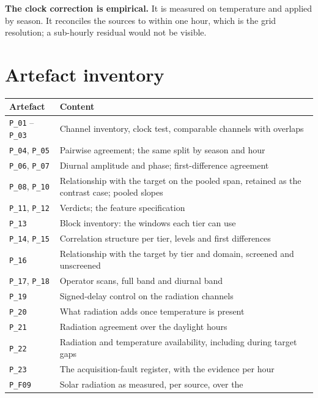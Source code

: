 \documentclass[11pt,a4paper]{article}
\begin{document}
\textbf{The clock correction is empirical.} It is measured on temperature and
applied by season. It reconciles the sources to within one hour, which is the
grid resolution; a sub-hourly residual would not be visible.

\section{Artefact inventory}

\begin{center}
\small
\begin{tabularx}{\textwidth}{L{3.0cm}Y}
\toprule
\textbf{Artefact} & \textbf{Content} \\
\midrule
\texttt{P\_01} -- \texttt{P\_03} & Channel inventory, clock test, comparable
channels with overlaps \\
\texttt{P\_04}, \texttt{P\_05} & Pairwise agreement; the same split by season and
hour \\
\texttt{P\_06}, \texttt{P\_07} & Diurnal amplitude and phase; first-difference
agreement \\
\texttt{P\_08}, \texttt{P\_10} & Relationship with the target on the pooled
span, retained as the contrast case; pooled slopes \\
\texttt{P\_11}, \texttt{P\_12} & Verdicts; the feature specification \\
\texttt{P\_13} & Block inventory: the windows each tier can use \\
\texttt{P\_14}, \texttt{P\_15} & Correlation structure per tier, levels and
first differences \\
\texttt{P\_16} & Relationship with the target by tier and domain, screened and
unscreened \\
\texttt{P\_17}, \texttt{P\_18} & Operator scans, full band and diurnal band \\
\texttt{P\_19} & Signed-delay control on the radiation channels \\
\texttt{P\_20} & What radiation adds once temperature is present \\
\texttt{P\_21} & Radiation agreement over the daylight hours \\
\texttt{P\_22} & Radiation and temperature availability, including during
target gaps \\
\texttt{P\_23} & The acquisition-fault register, with the evidence per hour \\
\addlinespace
\texttt{P\_F09} & Solar radiation as measured, per source, over the

\end{tabularx}
\end{center}
\end{document}
